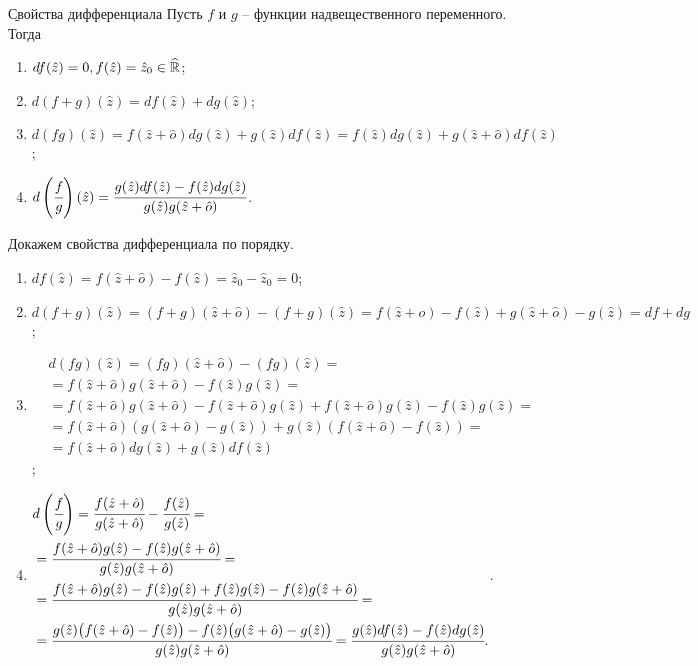 \b{Свойства дифференциала} Пусть $f$ и $g$ -- функции надвещественного переменного. Тогда
\begin{enumerate}
	\item $df(\hat{z})=0, f(\hat{z})=\hat{z}_0\in\widehat{\mathbb{R}}$;
	\item $d(f+g)(\hat{z})=df(\hat{z})+dg(\hat{z})$;
	\item $d(fg)(\hat{z})=f(\hat{z}+\hat{o})dg(\hat{z})+g(\hat{z})df(\hat{z})=f(\hat{z})dg(\hat{z})+g(\hat{z}+\hat{o})df(\hat{z})$;
	\item $d\left({\cfrac{f}{g}}\right)(\hat{z})=\cfrac{g(\hat{z})df(\hat{z})-f(\hat{z})dg(\hat{z})}{g(\hat{z})g(\hat{z}+\hat{o})}$.
\end{enumerate}
Докажем свойства дифференциала по порядку.
\begin{enumerate}
	\item $df(\hat{z})=f(\hat{z}+\hat{o})-f(\hat{z})=\hat{z}_0-\hat{z}_0=0$;
	\item $d(f+g)(\hat{z})=(f+g)(\hat{z}+\hat{o})-(f+g)(\hat{z})=f(\hat{z}+\hat{o})-f(\hat{z})+g(\hat{z}+\hat{o})-g(\hat{z})=df+dg$;
	\item $\begin{aligned}
		& d(fg)(\hat{z})=(fg)(\hat{z}+\hat{o})-(fg)(\hat{z})=\\
		& =f(\hat{z}+\hat{o})g(\hat{z}+\hat{o})-f(\hat{z})g(\hat{z})=\\
		& =f(\hat{z}+\hat{o})g(\hat{z}+\hat{o})-f(\hat{z}+\hat{o})g(\hat{z})+f(\hat{z}+\hat{o})g(\hat{z})-f(\hat{z})g(\hat{z})=\\
		& =f(\hat{z}+\hat{o})\left(g(\hat{z}+\hat{o})-g(\hat{z})\right)+g(\hat{z})\left(f(\hat{z}+\hat{o})-f(\hat{z})\right)=\\
		& =f(\hat{z}+\hat{o})dg(\hat{z})+g(\hat{z})df(\hat{z})
		\end{aligned}$;
	\item $\begin{aligned}
		& d\left({\cfrac{f}{g}}\right)=\cfrac{f(\hat{z}+\hat{o})}{g(\hat{z}+\hat{o})}-\cfrac{f(\hat{z})}{g(\hat{z})}=\\
		& =\cfrac{f(\hat{z}+\hat{o})g(\hat{z})-f(\hat{z})g(\hat{z}+\hat{o})}{g(\hat{z})g(\hat{z}+\hat{o})}=\\
		& =\cfrac{f(\hat{z}+\hat{o})g(\hat{z})-f(\hat{z})g(\hat{z})+f(\hat{z})g(\hat{z})-f(\hat{z})g(\hat{z}+\hat{o})}{g(\hat{z})g(\hat{z}+\hat{o})}= \\
		& =\cfrac{g(\hat{z})\big(f(\hat{z}+\hat{o})-f(\hat{z})\big)-f(\hat{z})\big(g(\hat{z}+\hat{o})-g(\hat{z})\big)}{g(\hat{z})g(\hat{z}+\hat{o})}=\cfrac{g(\hat{z})df(\hat{z})-f(\hat{z})dg(\hat{z})}{g(\hat{z})g(\hat{z}+\hat{o})}.
		\end{aligned}$.
\end{enumerate}